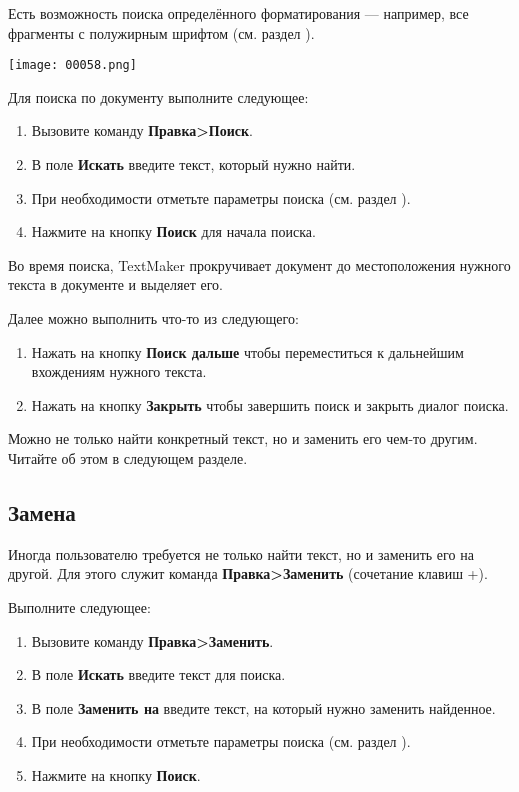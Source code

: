 ﻿\documentclass[a4paper,10pt]{article}
\begin{document}
Есть возможность поиска определённого форматирования — например, все фрагменты с полужирным шрифтом (см. раздел ).

\texttt{[image: 00058.png]}

Для поиска по документу выполните следующее:
\begin{enumerate}
 \item Вызовите команду \textbf{Правка>Поиск}.
 \item В поле \textbf{Искать} введите текст, который нужно найти.
 \item При необходимости отметьте параметры поиска (см. раздел ).
 \item Нажмите на кнопку \textbf{Поиск} для начала поиска.
\end{enumerate}

Во время поиска, TextMaker прокручивает документ до местоположения нужного текста в документе и выделяет его.

Далее можно выполнить что-то из следующего:
\begin{enumerate}[label=\Alph*]
\item Нажать на кнопку \textbf{Поиск дальше} чтобы переместиться к дальнейшим вхождениям нужного текста.
 \item Нажать на кнопку \textbf{Закрыть} чтобы завершить поиск и закрыть диалог поиска.
\end{enumerate}

Можно не только найти конкретный текст, но и заменить его чем-то другим. Читайте об этом в следующем разделе.

\subsection{Замена}
Иногда пользователю требуется не только найти текст, но и заменить его на другой. Для этого служит команда \textbf{Правка>Заменить} (сочетание клавиш +).

Выполните следующее:
\begin{enumerate}
 \item Вызовите команду \textbf{Правка>Заменить}.
 \item В поле \textbf{Искать} введите текст для поиска.
 \item В поле \textbf{Заменить на} введите текст, на который нужно заменить найденное.
 \item При необходимости отметьте параметры поиска (см. раздел ).
 \item Нажмите на кнопку \textbf{Поиск}.
\end{enumerate}
\end{document}
